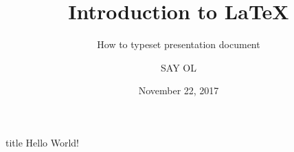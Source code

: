 \documentclass{beamer}
\title[I2L]{Introduction to \LaTeX{}}
\subtitle[Beamer]{How to typeset presentation document}
\author[SAY]{SAY OL}
\institute[KhTUG]{Khmer TeX Users Group}
\date[11/22/2017]{November 22, 2017}
\begin{document}
	\begin{frame}
	\maketitle
	\end{frame}
	\begin{frame}{title}
	Hello World!
	\end{frame}
\end{document}
